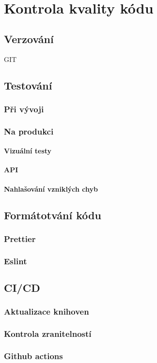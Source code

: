 \chapter{Kontrola kvality kódu}
\section{Verzování}
GIT
\section{Testování}
\subsection{Při vývoji}  

\subsection{Na produkci} 
\subsubsection{Vizuální testy}
\subsubsection{API}
\subsubsection{Nahlašování vzniklých chyb}


 
\section{Formátotvání kódu}  
\subsection{Prettier}
\subsection{Eslint}


\section{CI/CD}
\subsection{Aktualizace knihoven}
\subsection{Kontrola zranitelností}
\subsection{Github actions} 